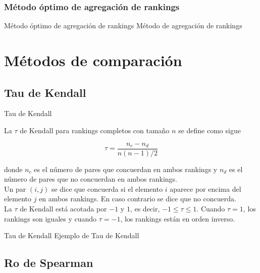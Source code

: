 \documentclass[11pt]{beamer}
\begin{document}
	\subsubsection{Método óptimo de agregación de rankings}
	
	\begin{frame}{Método óptimo de agregación de rankings}
		Método de agregación de rankings
	\end{frame}
	
	\section{Métodos de comparación}
	
	\subsection{Tau de Kendall}
	
	\begin{frame}{Tau de Kendall}
		\begin{defi}
			La $\tau$ de Kendall para rankings completos con tamaño $n$ se define como sigue
			
			\begin{equation} \label{def:tau_kendall}
			\tau = \dfrac{n_c - n_d}{n(n-1)/2}
			\end{equation}
			
			donde $n_c$ es el número de pares que concuerdan en ambos rankings y $n_d$ es el número de pares que no concuerdan en ambos rankings.\\
			
			Un par $(i,j)$ se dice que concuerda si el elemento $i$ aparece por encima del elemento $j$ en ambos rankings. En caso contrario se dice que no concuerda.\\
			
			La $\tau$ de Kendall está acotada por $-1$ y $1$, es decir, $-1 \leq \tau \leq 1$. Cuando $\tau = 1$, los rankings son iguales y cuando $\tau = -1$, los rankings están en orden inverso.  
		\end{defi}
	\end{frame}
	
	\begin{frame}{Tau de Kendall}
		Ejemplo de Tau de Kendall
	\end{frame}
	
	\subsection{Ro de Spearman}
	
\end{document}

